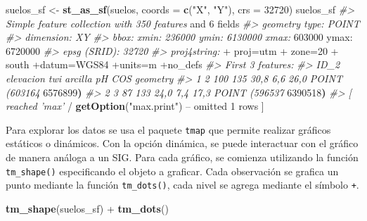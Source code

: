 \documentclass[11pt,b5paper,]{krantz}
\newenvironment{Shaded}{}{}
\newcommand{\CommentTok}[1]{\textcolor[rgb]{0.38,0.63,0.69}{\textit{#1}}}
\newcommand{\DataTypeTok}[1]{\textcolor[rgb]{0.56,0.13,0.00}{#1}}
\newcommand{\DecValTok}[1]{\textcolor[rgb]{0.25,0.63,0.44}{#1}}
\newcommand{\ErrorTok}[1]{\textcolor[rgb]{1.00,0.00,0.00}{\textbf{#1}}}
\newcommand{\KeywordTok}[1]{\textcolor[rgb]{0.00,0.44,0.13}{\textbf{#1}}}
\newcommand{\NormalTok}[1]{#1}
\newcommand{\OperatorTok}[1]{\textcolor[rgb]{0.40,0.40,0.40}{#1}}
\newcommand{\StringTok}[1]{\textcolor[rgb]{0.25,0.44,0.63}{#1}}
\begin{document}
\begin{Shaded}
\begin{Highlighting}[]
\NormalTok{suelos_sf <-}\StringTok{ }\KeywordTok{st_as_sf}\NormalTok{(suelos, }
                      \DataTypeTok{coords =} \KeywordTok{c}\NormalTok{(}\StringTok{"X"}\NormalTok{, }\StringTok{"Y"}\NormalTok{), }
                      \DataTypeTok{crs =} \DecValTok{32720}\NormalTok{)}
\NormalTok{suelos_sf}
\CommentTok{#> Simple feature collection with 350 features}
\NormalTok{and }\DecValTok{6}\NormalTok{ fields}
\CommentTok{#> geometry type: POINT}
\CommentTok{#> dimension: XY}
\CommentTok{#> bbox: xmin: 236000 ymin: 6130000 xmax:}
\DecValTok{603000}\NormalTok{ ymax}\OperatorTok{:}\StringTok{ }\DecValTok{6720000}
\CommentTok{#> epsg (SRID): 32720}
\CommentTok{#> proj4string: }
    \OperatorTok{+}\StringTok{ }\NormalTok{proj=utm }
    \OperatorTok{+}\StringTok{ }\NormalTok{zone=}\DecValTok{20} 
    \OperatorTok{+}\StringTok{ }\NormalTok{south}
\OperatorTok{+}\NormalTok{datum=WGS84 }\OperatorTok{+}\NormalTok{units=m }\OperatorTok{+}\NormalTok{no_defs}
\CommentTok{#> First 3 features:}
\CommentTok{#> ID_2 elevacion twi arcilla pH COS geometry}
\CommentTok{#> 1 2 100 135 30,8 6,6 26,0 POINT (603164}
\DecValTok{6576899}\ErrorTok{)}
\CommentTok{#> 2 3 87 133 24,0 7,4 17,3 POINT (596537}
\DecValTok{6390518}\ErrorTok{)}
\CommentTok{#> [ reached 'max'}
    \OperatorTok{/}\StringTok{ }\KeywordTok{getOption}\NormalTok{(}\StringTok{"max.print"}\NormalTok{) }\OperatorTok{--}
\NormalTok{omitted }\DecValTok{1}\NormalTok{ rows ]}
\end{Highlighting}
\end{Shaded}

Para explorar los datos se usa el paquete \texttt{tmap} que permite realizar gráficos estáticos o dinámicos. Con la opción dinámica, se puede interactuar con el gráfico de manera análoga a un SIG. Para cada gráfico, se comienza utilizando la función \texttt{tm\_shape()} especificando el objeto a graficar. Cada observación se grafica un punto mediante la función \texttt{tm\_dots()}, cada nivel se agrega mediante el símbolo \texttt{+}.

\begin{Shaded}
\begin{Highlighting}[]
\KeywordTok{tm_shape}\NormalTok{(suelos_sf) }\OperatorTok{+}\StringTok{ }
\StringTok{  }\KeywordTok{tm_dots}\NormalTok{()}
\end{Highlighting}
\end{Shaded}
\end{document}
